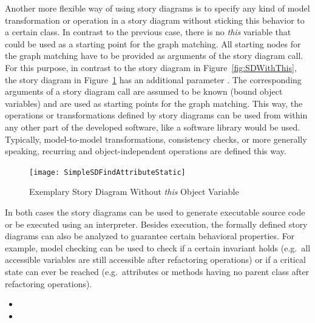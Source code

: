 Another more flexible way of using story diagrams is to specify any kind of model transformation or operation in a story diagram without sticking this behavior to a certain class.
In contrast to the previous case, there is no \emph{this} variable that could be used as a starting point for the graph matching.
All starting nodes for the graph matching have to be provided as arguments of the story diagram call.
For this purpose, in contrast to the story diagram in Figure~\ref{fig:SDWithThis}, the story diagram in Figure~\ref{fig:SDWithThisStatic} has an additional parameter .
The corresponding arguments of a story diagram call are assumed to be known (bound object variables) and are used as starting points for the graph matching.
This way, the operations or transformations defined by story diagrams can be used from within any other part of the developed software, like a software library would be used.
Typically, model-to-model transformations, consistency checks, or more generally speaking, recurring and object-independent operations are defined this way.

\begin{figure}[htb]
	\centering
  \texttt{[image: SimpleSDFindAttributeStatic]} 
  \caption{Exemplary Story Diagram Without \emph{this} Object Variable}
  \label{fig:SDWithThisStatic}
\end{figure}


In both cases the story diagrams can be used to generate executable source code or be executed using an interpreter.
Besides execution, the formally defined story diagrams can also be analyzed to guarantee certain behavioral properties.
For example, model checking can be used to check if a certain invariant holds
(e.g.\ all accessible variables are still accessible after refactoring operations)
or if a critical state can ever be reached (e.g.\ attributes or methods having no parent class after refactoring operations).


\begin{itemize}
  \item {}
  \item {}
\end{itemize}


